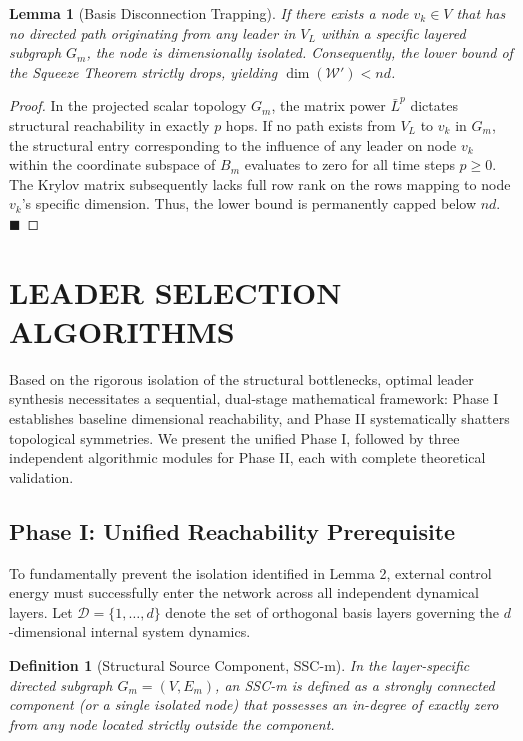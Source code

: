 \documentclass{IEEEtran}
\newtheorem{lemma}{Lemma}
\newtheorem{definition}{Definition}
\begin{document}
	\begin{lemma}[Basis Disconnection Trapping]
		If there exists a node $v_k \in V$ that has no directed path originating from any leader in $V_L$ within a specific layered subgraph $G_m$, the node is dimensionally isolated. Consequently, the lower bound of the Squeeze Theorem strictly drops, yielding $\dim(\mathcal{W}') < nd$.
	\end{lemma}
	\begin{proof}
		In the projected scalar topology $G_m$, the matrix power $\bar{L}^p$ dictates structural reachability in exactly $p$ hops. If no path exists from $V_L$ to $v_k$ in $G_m$, the structural entry corresponding to the influence of any leader on node $v_k$ within the coordinate subspace of $B_m$ evaluates to zero for all time steps $p \ge 0$. The Krylov matrix subsequently lacks full row rank on the rows mapping to node $v_k$'s specific dimension. Thus, the lower bound is permanently capped below $nd$. \hfill $\blacksquare$
	\end{proof}
	
	\section{LEADER SELECTION ALGORITHMS}
	Based on the rigorous isolation of the structural bottlenecks, optimal leader synthesis necessitates a sequential, dual-stage mathematical framework: Phase I establishes baseline dimensional reachability, and Phase II systematically shatters topological symmetries. We present the unified Phase I, followed by three independent algorithmic modules for Phase II, each with complete theoretical validation.
	
	\subsection{Phase I: Unified Reachability Prerequisite}
	To fundamentally prevent the isolation identified in Lemma 2, external control energy must successfully enter the network across all independent dynamical layers. Let $\mathcal{D} = \{1, \dots, d\}$ denote the set of orthogonal basis layers governing the $d$-dimensional internal system dynamics.
	
	\begin{definition}[Structural Source Component, SSC-m]
		In the layer-specific directed subgraph $G_m = (V, E_m)$, an SSC-m is defined as a strongly connected component (or a single isolated node) that possesses an in-degree of exactly zero from any node located strictly outside the component.
	\end{definition}
	
\end{document}
